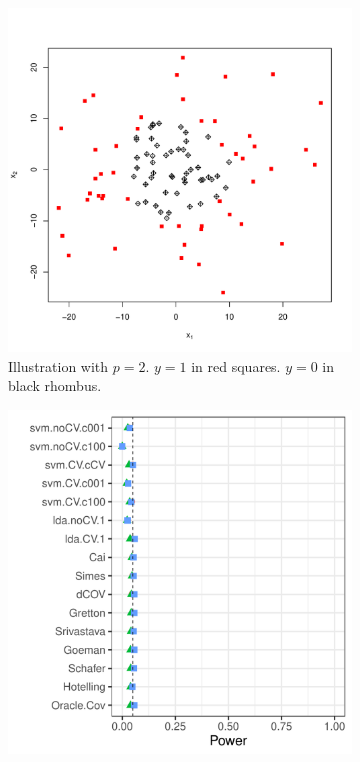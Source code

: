 \documentclass[]{bio}
\begin{document}
\begin{figure}[th]
	\centering
	\begin{subfigure}[t]{.3\columnwidth}
		\centering
		\includegraphics[width=1\linewidth]{art/quadratic-form}
		\caption{Illustration with $p=2$. 
			$y=1$ in red squares. $y=0$ in black rhombus.}
		\label{fig:quadratic-form}
	\end{subfigure}
	\begin{subfigure}[t]{.3\columnwidth}
		\centering
	\includegraphics[width=1\columnwidth]{"art/file42"}

\end{subfigure}
\end{figure}
\end{document}
